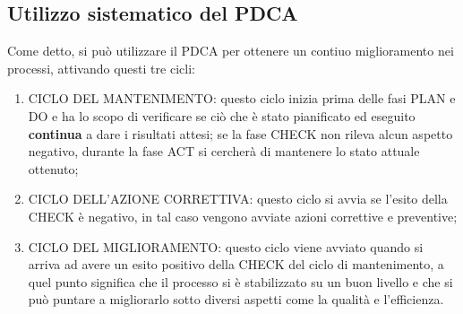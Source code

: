 \subsection{Utilizzo sistematico del PDCA}
Come detto, si può utilizzare il PDCA per ottenere un contiuo miglioramento nei processi, attivando questi tre cicli:
\begin{enumerate}
\item{CICLO DEL MANTENIMENTO:} questo ciclo inizia prima delle fasi PLAN e DO e ha lo scopo di verificare se ciò che è stato pianificato ed eseguito \textbf{continua} a dare i risultati attesi; se la fase CHECK non rileva alcun aspetto negativo, durante la fase ACT si cercherà di mantenere lo stato attuale ottenuto;
\item{CICLO DELL'AZIONE CORRETTIVA:} questo ciclo si avvia se l'esito della CHECK è negativo, in tal caso vengono avviate azioni correttive e preventive;
\item{CICLO DEL MIGLIORAMENTO:} questo ciclo viene avviato quando si arriva ad avere un esito positivo della CHECK del ciclo di mantenimento, a quel punto significa che il processo si è stabilizzato su un buon livello e che si può puntare a migliorarlo sotto diversi aspetti come la qualità e l'efficienza.
\end{enumerate}